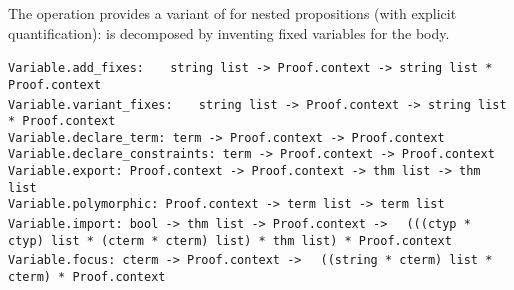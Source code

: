 \begin{isabellebody}
\begin{isamarkuptext}
  The  operation provides a variant of 
  for nested propositions (with explicit quantification):  is
  decomposed by inventing fixed variables  for the body.%
\end{isamarkuptext}%
\isamarkuptrue%
%
\isadelimmlref
%
\endisadelimmlref
%
\isatagmlref
%
\begin{isamarkuptext}%
\begin{mldecls}
  \verb|Variable.add_fixes: |\isasep\isanewline%
\verb|  string list -> Proof.context -> string list * Proof.context| \\
  \verb|Variable.variant_fixes: |\isasep\isanewline%
\verb|  string list -> Proof.context -> string list * Proof.context| \\
  \verb|Variable.declare_term: term -> Proof.context -> Proof.context| \\
  \verb|Variable.declare_constraints: term -> Proof.context -> Proof.context| \\
  \verb|Variable.export: Proof.context -> Proof.context -> thm list -> thm list| \\
  \verb|Variable.polymorphic: Proof.context -> term list -> term list| \\
  \verb|Variable.import: bool -> thm list -> Proof.context ->|\isasep\isanewline%
\verb|  (((ctyp * ctyp) list * (cterm * cterm) list) * thm list) * Proof.context| \\
  \verb|Variable.focus: cterm -> Proof.context ->|\isasep\isanewline%
\verb|  ((string * cterm) list * cterm) * Proof.context| \\
  \end{mldecls}


\end{isamarkuptext}
\end{isabellebody}
